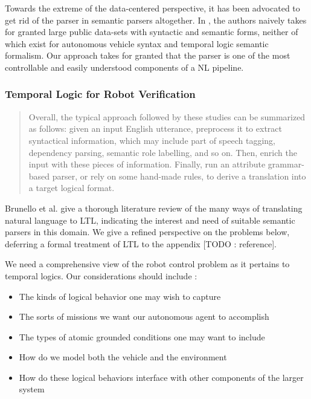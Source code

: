 \documentclass[a4paper, 11pt]{article}
\begin{document}
Towards the extreme of the data-centered perspective, it has been advocated to
get rid of the parser in semantic parsers altogether. In \cite{dontParse}, the
authors naively takes for granted large public data-sets with syntactic and
semantic forms, neither of which exist for autonomous vehicle syntax and
temporal logic semantic formalism. Our approach takes for granted that the
parser is one of the most controllable and easily understood components of a NL
pipeline.

\subsubsection{Temporal Logic for Robot Verification}

\begin{quote}
Overall, the typical approach followed by these studies can be summarized as follows:
given an input English utterance, preprocess it to extract syntactical information, which may
include part of speech tagging, dependency parsing, semantic role labelling, and so on. Then,
enrich the input with these pieces of information. Finally, run an attribute grammar-based
parser, or rely on some hand-made rules, to derive a translation into a target logical format.
\cite{brunello_et_al}
\end{quote}

Brunello et al. give a thorough literature review of the many ways of
translating natural language to LTL, indicating the interest and need of
suitable semantic parsers in this domain. We give a refined perspective on the
problems below, deferring a formal treatment of LTL to the appendix [TODO :
reference].

We need a comprehensive view of the robot control problem as it pertains to
temporal logics. Our considerations should include :

\begin{itemize}
\item The kinds of logical behavior one may wish to capture
\item The sorts of missions we want our autonomous agent to accomplish
\item The types of atomic grounded conditions one may want to include
\item How do we model both the vehicle and the environment
\item How do these logical behaviors interface with other components of the
  larger system
\end{itemize}
\end{document}
